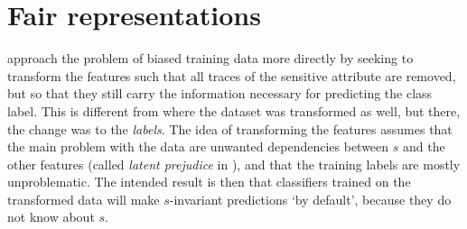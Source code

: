 \section{Fair representations}\label{sec:fair-representation}
\citet{zemel2013learning} approach the problem of biased training data more directly
by seeking to transform the features such that all traces of the sensitive attribute are removed,
but so that they still carry the information necessary for predicting the class label.
This is different from \citet{kamiran2009classifying} where the dataset was transformed as well,
but there, the change was to the \emph{labels}.
The idea of transforming the features assumes that the main problem with the data
are unwanted dependencies between $s$ and the other features (called \emph{latent prejudice} in \citet{kamishima2012fairness}),
and that the training labels are mostly unproblematic.
The intended result is then that classifiers trained on the transformed data will make $s$-invariant predictions `by default',
because they do not know about $s$.

